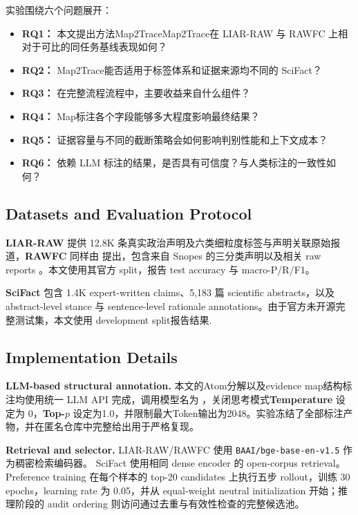 \documentclass[letterpaper]{article}
\begin{document}
实验围绕六个问题展开：

\begin{itemize}
\item \textbf{RQ1：} 本文提出方法Map2TraceMap2Trace在 LIAR-RAW 与 RAWFC 上相对于可比的同任务基线表现如何？
\item \textbf{RQ2：} Map2Trace能否适用于标签体系和证据来源均不同的 SciFact？
\item \textbf{RQ3：} 在完整流程流程中，主要收益来自什么组件？
\item \textbf{RQ4：} Map标注各个字段能够多大程度影响最终结果？
\item \textbf{RQ5：} 证据容量与不同的截断策略会如何影响判别性能和上下文成本？
\item \textbf{RQ6：} 依赖 LLM 标注的结果，是否具有可信度？与人类标注的一致性如何？
\end{itemize}

\subsection{Datasets and Evaluation Protocol}

\textbf{LIAR-RAW} \citep{Yang2022CofCED} 提供 12.8K 条真实政治声明及六类细粒度标签与声明关联原始报道，\textbf{RAWFC}
同样由 \citep{Yang2022CofCED} 提出，包含来自 Snopes 的三分类声明以及相关 raw reports \citep{Yang2022CofCED}。本文使用其官方 split，报告 test accuracy 与 macro-P/R/F1。

\textbf{SciFact} \citep{Wadden2020SciFact} 包含 1.4K expert-written claims、5,183 篇 scientific abstracts，以及 abstract-level stance 与 sentence-level rationale annotations。由于官方未开源完整测试集，本文使用 development split报告结果.

\subsection{Implementation Details}

\textbf{LLM-based structural annotation.} 本文的Atom分解以及evidence map结构标注均使用统一 LLM API 完成，调用模型名为 \texttt{} \citep{DeepSeekAI2026V4}，关闭思考模式\textbf{Temperature} 设定为 0，\textbf{Top-$p$} 设定为1.0，并限制最大Token输出为2048。实验冻结了全部标注产物，并在匿名仓库中完整给出用于严格复现。

\textbf{Retrieval and selector.} LIAR-RAW/RAWFC 使用 \texttt{BAAI/bge-base-en-v1.5} \citep{Xiao2023BGE} 作为稠密检索编码器。 SciFact 使用相同 dense encoder 的 open-corpus retrieval。Preference training 在每个样本的 top-20 candidates 上执行五步 rollout，训练 30 epochs，learning rate 为 0.05，并从 equal-weight neutral initialization 开始；推理阶段的 audit ordering 则访问通过去重与有效性检查的完整候选池。
\end{document}
